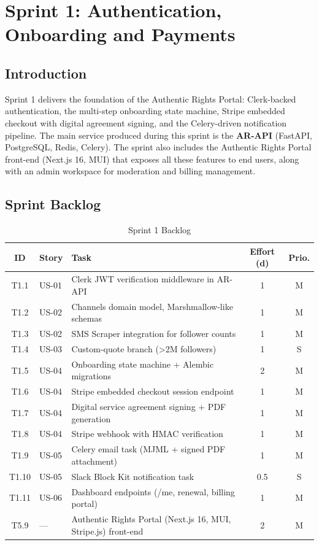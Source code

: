 \chapter{Sprint 1: Authentication, Onboarding and Payments}

\section*{Introduction}

Sprint 1 delivers the foundation of the Authentic Rights Portal: Clerk-backed authentication,
the multi-step onboarding state machine, Stripe embedded checkout with digital agreement signing,
and the Celery-driven notification pipeline. The main service produced during this sprint is the
\textbf{AR-API} (FastAPI, PostgreSQL, Redis, Celery). The sprint also includes the Authentic
Rights Portal front-end (Next.js 16, MUI) that exposes all these features to end users, along
with an admin workspace for moderation and billing management.

\section{Sprint Backlog}

\begin{table}[H]
\centering
\caption{Sprint 1 Backlog}
\label{tab:sprint1_backlog}
\begin{tabularx}{\textwidth}{clXcc}
\toprule
\textbf{ID} & \textbf{Story} & \textbf{Task} & \textbf{Effort (d)} & \textbf{Prio.} \\
\midrule
T1.1 & US-01 & Clerk JWT verification middleware in AR-API         & 1 & M \\
T1.2 & US-02 & Channels domain model, Marshmallow-like schemas     & 1 & M \\
T1.3 & US-02 & SMS Scraper integration for follower counts         & 1 & M \\
T1.4 & US-03 & Custom-quote branch (\textgreater 2M followers)      & 1 & S \\
T1.5 & US-04 & Onboarding state machine + Alembic migrations       & 2 & M \\
T1.6 & US-04 & Stripe embedded checkout session endpoint           & 1 & M \\
T1.7 & US-04 & Digital service agreement signing + PDF generation  & 1 & M \\
T1.8 & US-04 & Stripe webhook with HMAC verification               & 1 & M \\
T1.9 & US-05 & Celery email task (MJML + signed PDF attachment)    & 1 & M \\
T1.10 & US-05 & Slack Block Kit notification task                  & 0.5 & S \\
T1.11 & US-06 & Dashboard endpoints (/me, renewal, billing portal) & 1 & M \\
T5.9  & —     & Authentic Rights Portal (Next.js 16, MUI, Stripe.js) front-end & 2 & M \\
\bottomrule
\end{tabularx}
\end{table}

